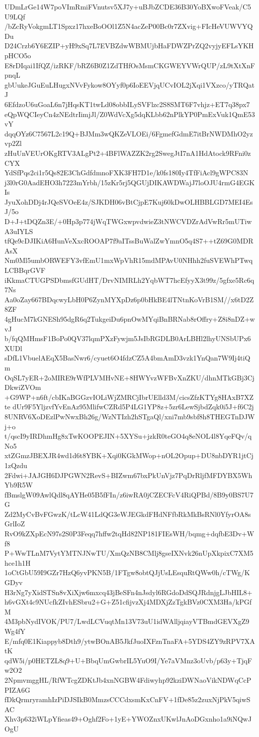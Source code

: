 UDmLrGe14W7poVImRmiFVnutsv5XJ7y+uBJbZCDE36B30YoBXwoFVeak/C5U9LQf
/bZcRyVokgmLT1Spxz17hxeBoOOl1Z5N4acZeP00Bc0r7ZXvig+FIcHeVUWVYQDu
D24Crzb6Y6EZIP+yH9xSq7L7EVBZdwWBMUjbHaFDWZPrZQ2vyjyEFLsYKHpHCO5o
E8rDIqai1IfQZ/izRKF/bRZ6B0Z1ZdTHfOsMsmCKGWEYVWrQUP/zL9tXtXnFpnqL
gbUukeJGuEuLHugxNVvFykow8OYyf0p6IoEEVjqUCvIOL2jXqi1VXzco/yTRQatJ
6EfdzoU6uGoaL6n7jHqsKT1twLd08obbILySVFlzc2S8SMT6F7vhjz+ET7q38px7
eQpWQCIeyCn4zNEdtrIimjJl/Z0WdVcXg5dqKLbb62nPlkYP0PmExVuk1QmE53vY
dqqOYz6C7567L2c19Q+BJMm3wQKZeVLOEi/6FgmefGdmE7itBrNWDMhO2yzvp2Zl
zHuUnVEUrOKgRTV3ALgPt2+4BFlWAZZK2rg2SwegJtI7nA1HdAtock9RFni0zCYX
YdSfPqs2ci1r5Qs82E3ChGdfdmnoFXK3FH7D1e/k0fs180Iy4TfFiAcl9gWPC83N
j3l0rG0AadEHO3h7223mYrbh/15zKr5rj5QGUjDIKAWDWajJ7loOJU4rmG4EGKIs
JyuXohDDj4rJQeSVOeE4z/SJKDH06vBtCjpE7Kuj60kDwOLHBBLGD7MEI4EsJ/5o
D+J+tDQZn3E/+0Hp3p774jWqTWGxwpvdwieZ3tNWCVDZrAdVwRr5mUTiwA3uIYLS
tfQe9cDJIKiA6HunVeXxcROOAP7f9aITssBuWalZwYmnO5q4S7++tZ69G0MDRAsX
Nm0Ml5umbORWEFY3vfEmU1mxWpVhR15mdMPAvU0NHhh2fuSVEWhPTwqLCBBqrGVF
iKkmaCTUGPSDbmsfGUdHT/DrvNIMRLh2YqbWT7hcEfyyX3t99z/5gfxe5Rc6q7Ns
Aa0oZay667BDqcwyLbH0P6ZynMYXpDz6p0bHkBE4lTNtnKoVrB1SM//x6tD2Z8ZF
4gHucM7kGNESh95dgR6q2TukgeiDu6pnOwMYqiBnBRNab8rOffry+Z8i8nDZ+wvJ
b/fqQMHmsF1BoPo0QV37lqmPXzFywjm5JsIbRGDLB0ArLBHl2lhyUNSbUPx6XUDl
sDfL1VbuelAEqX5BasNwr6/cyuet6O4fdzCZ5A4bmAmD3vzk1YnQan7W9Ij4tiQm
OqSL7yER+2oMIRE9rWfPLVMHvNE+8HWYvzWFBvXnZKU/dhnMTkGBj3CjDkwiZVOm
+G9WP+n6ft/cbIKaBGGzvIOLiWjZMRCjIbrUElld3M/cicsZfzKTYg8HAxB7XZte
dUr9F5YljzvfYvEnAz95MlifwCZRd5P4LG1YP8z+5zr6LewSjbdZqk0i5J+f6C2j
8UNRV6XoDEzlPwNwxBh26g/WzNTIzh2hSTgaQl/xni7mb9sbf8h8THEGTnDJWj+o
t/qscI9yIRDhmHg8xTwKOOPEJIN+5XYSu+jzkR0teGO4q8eNOL4l8YqeFQv/qNo5
xtZGmzJBEXJR4wd1d6t8YBK+Xqi0KGkMWop+nOL2Opup+DU8nbDYR1jtCj1zQzdu
2Fdwi+JAJGH6DJPGWN2RevS+BIZwm67bxPkUnVjz7PqDrRljfMFDYBX5WhYb9R5W
fBmslgW09AwlQdl8qAYHe05B5fFIn/z6iwRA0jCZECFcV4RiQPBd/8B9y0BS7U7G
Zd2MyCvBvFGwzK/tLcW41LdQG3eWJEGkdFHdNFfbRkMkBsRNl0YfyrOA8sGrlIoZ
RvO9kZXpEcN97s2S0P3Feqq7hffw2tqHd82NP181FIEsWH/bqmg+dqfbE3Dv+Wf8
P+WwTLnM7VytYMTNJNwTU/XmQzNB8CMlj8gseIXNvk26nUpXkpixC7XM5hce1h1H
1oCtGbU59I9GZr7HzQ6yvPKN5B/1FTgw8obtQJjUsLEsquRtQWw0h/cTWg/KGDyv
H3rNg7yXidSTSn8vXiXjw6mxcq43jBeSFn4nJsdyl6RGdoDdSQJRdnjgLJbHIL8+
h6vGXt4c9NUcfkZIvhESbru2+G+Z51cfijvzXj4MDXjZzTgkBVz0CXM3Ha/kPGfM
4M3pbNydIVOK/PU7/LwdLCVuqtMn13V73uU1idWAlljqiayVTBmdGEVXgZ9Wg4fY
E/mfq0E1Kiappyb8Dth9/ytwBOnAB5JkfJuoIXFznTnaFA+5YDS4ZY9zRPV7XAtK
qdW5i/p0HETZL8q9+U+BbqUmGwbrIL5YuO9I/Ye7aVMnz3oUvb/p63y+TjqFw2O2
2NpmvmggHL/RfWTcgZDKtJb4xnNGBW4Fdiwyhp92kziDWNaoVikNDWqCcPPIZA6G
fDkQrmryramhIzPiDJSIkB0MmzsCCCdxsmKxCnFV+1fDe85z2zuxNjPkV5qiwSAC
Xhv3p632iWLpYfieas49+Oghf2Fo+1yE+YWOZnxUKwlJnAoDGxnho1a9iNQwJOgU
